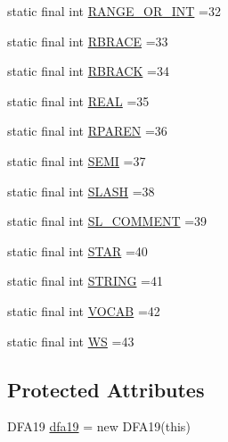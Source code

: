 \begin{DoxyCompactItemize}
\item 
static final int \hyperlink{classorg_1_1tzi_1_1use_1_1parser_1_1generator_1_1_generator_lexer_a84af128a486368634e9e725b2b5ec46f}{R\-A\-N\-G\-E\-\_\-\-O\-R\-\_\-\-I\-N\-T} =32
\item 
static final int \hyperlink{classorg_1_1tzi_1_1use_1_1parser_1_1generator_1_1_generator_lexer_a19252813040ed1e86e9049800602c880}{R\-B\-R\-A\-C\-E} =33
\item 
static final int \hyperlink{classorg_1_1tzi_1_1use_1_1parser_1_1generator_1_1_generator_lexer_ae433d1384f542a54827409ff790af4e2}{R\-B\-R\-A\-C\-K} =34
\item 
static final int \hyperlink{classorg_1_1tzi_1_1use_1_1parser_1_1generator_1_1_generator_lexer_a0946d7042b8e6c5d8310f718f4e48757}{R\-E\-A\-L} =35
\item 
static final int \hyperlink{classorg_1_1tzi_1_1use_1_1parser_1_1generator_1_1_generator_lexer_a3a87822ef7f8ef8c34da45226eb9d981}{R\-P\-A\-R\-E\-N} =36
\item 
static final int \hyperlink{classorg_1_1tzi_1_1use_1_1parser_1_1generator_1_1_generator_lexer_a4702f2f304b6151497e2bd8160d06a9c}{S\-E\-M\-I} =37
\item 
static final int \hyperlink{classorg_1_1tzi_1_1use_1_1parser_1_1generator_1_1_generator_lexer_a737774e1aec411ee4ec34ef459659509}{S\-L\-A\-S\-H} =38
\item 
static final int \hyperlink{classorg_1_1tzi_1_1use_1_1parser_1_1generator_1_1_generator_lexer_a3ce0d2af3e62c853f1fc008bc23672ad}{S\-L\-\_\-\-C\-O\-M\-M\-E\-N\-T} =39
\item 
static final int \hyperlink{classorg_1_1tzi_1_1use_1_1parser_1_1generator_1_1_generator_lexer_ad71184970b13c457209cb7b1af820b21}{S\-T\-A\-R} =40
\item 
static final int \hyperlink{classorg_1_1tzi_1_1use_1_1parser_1_1generator_1_1_generator_lexer_af80462dd4378a607a7a63d5c02c2f501}{S\-T\-R\-I\-N\-G} =41
\item 
static final int \hyperlink{classorg_1_1tzi_1_1use_1_1parser_1_1generator_1_1_generator_lexer_acdece40d1b9fc90ca67f160d650926db}{V\-O\-C\-A\-B} =42
\item 
static final int \hyperlink{classorg_1_1tzi_1_1use_1_1parser_1_1generator_1_1_generator_lexer_ae3e71e28e143f018c22e986180211417}{W\-S} =43
\end{DoxyCompactItemize}
\subsection*{Protected Attributes}
\begin{DoxyCompactItemize}
\item 
D\-F\-A19 \hyperlink{classorg_1_1tzi_1_1use_1_1parser_1_1generator_1_1_generator_lexer_a90e88d1c4c0576cc8767fbf64cee3214}{dfa19} = new D\-F\-A19(this)
\end{DoxyCompactItemize}


